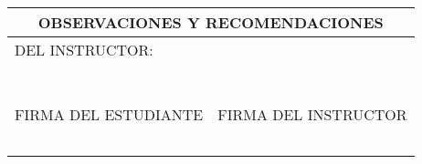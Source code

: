 \begin{center}
\end{center}

\begin{table}[!ht]
	\begin{center}
		\begin{tabular}{| p{9cm} | p{8.3cm} |}
			\hline
			\multicolumn{2}{|c|}{\textbf{OBSERVACIONES Y RECOMENDACIONES}}\\ \hline
			\multicolumn{2}{|p{17cm}|}{DEL INSTRUCTOR: } \\ \hline
			\multicolumn{2}{|p{17cm}|}{} \\ \hline
			\multicolumn{2}{|p{17cm}|}{} \\ \hline 
			\multicolumn{2}{|p{17cm}|}{} \\ \hline 
			\multicolumn{2}{|p{17cm}|}{} \\ \hline
			\multicolumn{2}{|p{17cm}|}{} \\ \hline 
			\multicolumn{2}{|p{17cm}|}{} \\ \hline 
			\multicolumn{2}{|p{17cm}|}{} \\ \hline
			FIRMA DEL ESTUDIANTE & FIRMA DEL INSTRUCTOR \\ \hline
			& \\  &\\ & \\ & \\ & \\ \hline
		\end{tabular}
	\end{center}
\end{table}